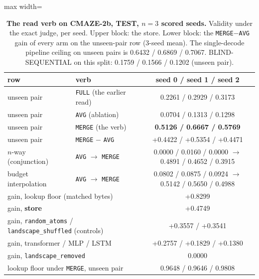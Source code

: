 \documentclass{article}
\begin{document}
\begin{table}[t]
\centering\small
\caption{\textbf{The read verb on CMAZE-2b, TEST, $n=3$ scored seeds.} Validity under the exact
judge, per seed. Upper block: the store. Lower block: the \texttt{MERGE}$-$\texttt{AVG} gain of
every arm on the unseen-pair row (3-seed mean). The single-decode pipeline ceiling on unseen
pairs is 0.6432 / 0.6869 / 0.7067. BLIND-SEQUENTIAL on this split: 0.1759 / 0.1566 / 0.1202
(unseen pair).}
\label{tab:verb}
\setlength{\tabcolsep}{3pt}
\begin{adjustbox}{max width=\linewidth}\begin{tabular}{llc}
\toprule
row & verb & seed 0 / seed 1 / seed 2 \\
\midrule
unseen pair & \texttt{FULL} (the earlier read) & 0.2261 / 0.2929 / 0.3173 \\
unseen pair & \texttt{AVG} (ablation) & 0.0704 / 0.1313 / 0.1298 \\
unseen pair & \texttt{MERGE} (the verb) & \textbf{0.5126 / 0.6667 / 0.5769} \\
unseen pair & \texttt{MERGE} $-$ \texttt{AVG} & +0.4422 / +0.5354 / +0.4471 \\
$n$-way (conjunction) & \texttt{AVG} $\to$ \texttt{MERGE} & 0.0000 / 0.0160 / 0.0000 $\to$ 0.4891 / 0.4652 / 0.3915 \\
budget interpolation & \texttt{AVG} $\to$ \texttt{MERGE} & 0.0802 / 0.0875 / 0.0924 $\to$ 0.5142 / 0.5650 / 0.4988 \\
\midrule
\multicolumn{2}{l}{gain, lookup floor (matched bytes)} & +0.8299 \\
\multicolumn{2}{l}{gain, \textbf{store}} & +0.4749 \\
\multicolumn{2}{l}{gain, \texttt{random\_atoms} / \texttt{landscape\_shuffled} (controls)} & +0.3557 / +0.3541 \\
\multicolumn{2}{l}{gain, transformer / MLP / LSTM} & +0.2757 / +0.1829 / +0.1380 \\
\multicolumn{2}{l}{gain, \texttt{landscape\_removed}} & 0.0000 \\
\multicolumn{2}{l}{lookup floor under \texttt{MERGE}, unseen pair} & 0.9648 / 0.9646 / 0.9808 \\
\bottomrule
\end{tabular}\end{adjustbox}
\end{table}
\end{document}
